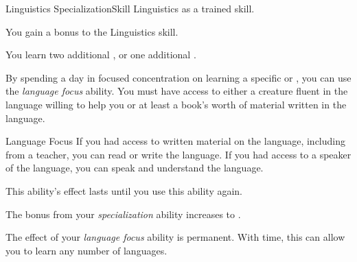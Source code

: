     \begin{feat}{Linguistics Specialization}{Skill}
        \featpre Linguistics as a trained skill.

         You gain a  bonus to the Linguistics skill.

         You learn two additional , or one additional .

         By spending a day in focused concentration on learning a specific  or , you can use the \textit{language focus} ability.
        You must have access to either a creature fluent in the language willing to help you or at least a book's worth of material written in the language.
        \begin{activeability}{Language Focus}
            \rankline
            If you had access to written material on the language, including from a teacher, you can read or write the language.
            If you had access to a speaker of the language, you can speak and understand the language.

            This ability's effect lasts until you use this ability again.
        \end{activeability}

         The bonus from your \textit{specialization} ability increases to .

         The effect of your \textit{language focus} ability is permanent.
        With time, this can allow you to learn any number of languages.
    \end{feat}


